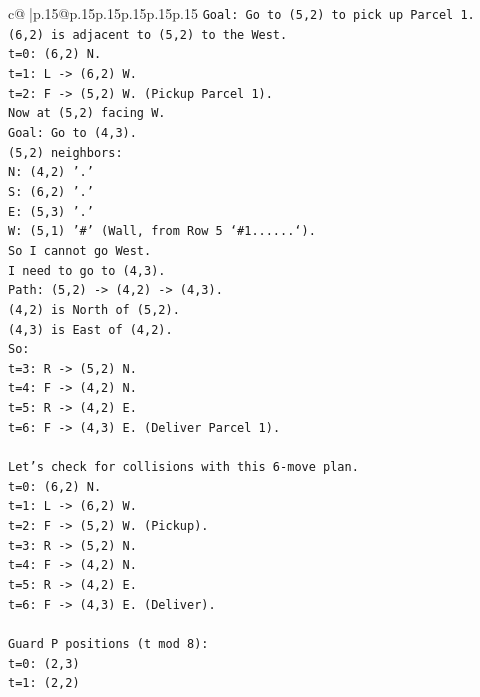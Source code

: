 \documentclass{article}
\begin{document}
{\begin{supertabular}{c@{$\;$}|p{.15\linewidth}@{}p{.15\linewidth}p{.15\linewidth}p{.15\linewidth}p{.15\linewidth}p{.15\linewidth}}
{{{\texttt{Goal: Go to (5,2) to pick up Parcel 1.} \\
\texttt{(6,2) is adjacent to (5,2) to the West.} \\
\texttt{t=0: (6,2) N.} \\
\texttt{t=1: L {-}> (6,2) W.} \\
\texttt{t=2: F {-}> (5,2) W. (Pickup Parcel 1).} \\
\texttt{Now at (5,2) facing W.} \\
\texttt{Goal: Go to (4,3).} \\
\texttt{(5,2) neighbors:} \\
\texttt{N: (4,2) '.'} \\
\texttt{S: (6,2) '.'} \\
\texttt{E: (5,3) '.'} \\
\texttt{W: (5,1) '\#' (Wall, from Row 5 `\#1......`).} \\
\texttt{So I cannot go West.} \\
\texttt{I need to go to (4,3).} \\
\texttt{Path: (5,2) {-}> (4,2) {-}> (4,3).} \\
\texttt{(4,2) is North of (5,2).} \\
\texttt{(4,3) is East of (4,2).} \\
\texttt{So:} \\
\texttt{t=3: R {-}> (5,2) N.} \\
\texttt{t=4: F {-}> (4,2) N.} \\
\texttt{t=5: R {-}> (4,2) E.} \\
\texttt{t=6: F {-}> (4,3) E. (Deliver Parcel 1).} \\
\\ 
\texttt{Let's check for collisions with this 6{-}move plan.} \\
\texttt{t=0: (6,2) N.} \\
\texttt{t=1: L {-}> (6,2) W.} \\
\texttt{t=2: F {-}> (5,2) W. (Pickup).} \\
\texttt{t=3: R {-}> (5,2) N.} \\
\texttt{t=4: F {-}> (4,2) N.} \\
\texttt{t=5: R {-}> (4,2) E.} \\
\texttt{t=6: F {-}> (4,3) E. (Deliver).} \\
\\ 
\texttt{Guard P positions (t mod 8):} \\
\texttt{t=0: (2,3)} \\
\texttt{t=1: (2,2)} \\
}}}
\end{supertabular}}
\end{document}
